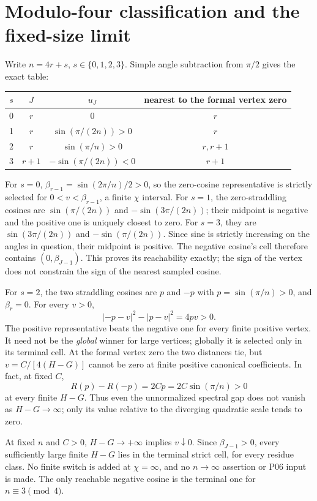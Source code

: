 \documentclass[11pt]{article}
\begin{document}
\section{Modulo-four classification and the fixed-size limit}
Write $n=4r+s$, $s\in\{0,1,2,3\}$. Simple angle subtraction from
$\pi/2$ gives the exact table:
\begin{center}
\begin{tabular}{@{}c c c c@{}}
\toprule
$s$&$J$&$u_J$&nearest to the formal vertex zero\\\midrule
0&$r$&$0$&$r$\\
1&$r$&$\sin(\pi/(2n))>0$&$r$\\
2&$r$&$\sin(\pi/n)>0$&$r,r+1$\\
3&$r+1$&$-\sin(\pi/(2n))<0$&$r+1$\\\bottomrule
\end{tabular}
\end{center}
For $s=0$, $\beta_{r-1}=\sin(2\pi/n)/2>0$, so the zero-cosine
representative is strictly selected for $0<v<\beta_{r-1}$, a finite
$\chi$ interval. For $s=1$, the zero-straddling cosines are
$\sin(\pi/(2n))$ and $-\sin(3\pi/(2n))$; their midpoint is negative
and the positive one is uniquely closest to zero. For $s=3$, they are
$\sin(3\pi/(2n))$ and $-\sin(\pi/(2n))$. Since sine is strictly
increasing on the angles in question, their midpoint is positive. The
negative cosine's cell therefore contains
$(0,\beta_{J-1})$. This proves its reachability exactly; the sign of
the vertex does not constrain the sign of the nearest sampled cosine.

For $s=2$, the two straddling cosines are $p$ and $-p$ with
$p=\sin(\pi/n)>0$, and $\beta_r=0$. For every $v>0$,
\[
 |-p-v|^2-|p-v|^2=4pv>0.
\]
The positive representative beats the negative one for every finite
positive vertex. It need not be the \emph{global} winner for large
vertices; globally it is selected only in its terminal cell. At the
formal vertex zero the two distances tie, but $v=C/[4(H-G)]$ cannot be
zero at finite positive canonical coefficients. In fact, at fixed $C$,
\[
 R(p)-R(-p)=2Cp=2C\sin(\pi/n)>0
\]
at every finite $H-G$. Thus even the unnormalized spectral gap does not
vanish as $H-G\to\infty$; only its value relative to the diverging
quadratic scale tends to zero.

At fixed $n$ and $C>0$, $H-G\to+\infty$ implies $v\downarrow0$.
Since $\beta_{J-1}>0$, every sufficiently large finite $H-G$ lies in
the terminal strict cell, for every residue class. No finite switch is
added at $\chi=\infty$, and no $n\to\infty$ assertion or P06 input
is made. The only reachable negative cosine is the terminal one for
$n\equiv3\pmod4$.
\end{document}
